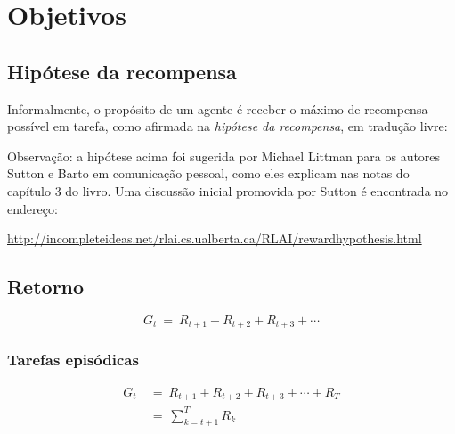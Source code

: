\documentclass{article}
\begin{document}
    \section{Objetivos}
    
        \subsection{Hipótese da recompensa}
    
            Informalmente, o propósito de um agente é receber o máximo de recompensa possível em tarefa, como afirmada na \emph{hipótese da recompensa}, em tradução livre:
            \begin{center}
            \noindent{}%
            \end{center}
            
            Observação: a hipótese acima foi sugerida por Michael Littman para os autores Sutton e Barto em comunicação pessoal, como eles explicam nas notas do capítulo 3 do livro. Uma discussão inicial promovida por Sutton é encontrada no endereço:
            
            \url{http://incompleteideas.net/rlai.cs.ualberta.ca/RLAI/rewardhypothesis.html}
        
        \subsection{Retorno}

            \begin{equation}
                G_t \ = \ R_{t+1} + R_{t+2} + R_{t+3} + \cdots
            \end{equation}

            \subsubsection{Tarefas episódicas}

                \begin{equation}
                \begin{split}
                    G_t & \ = \ R_{t+1} + R_{t+2} + R_{t+3} + \cdots + R_T \\
                    & \ = \ \sum_{k=t+1}^{T} R_k
                \end{split}
                \end{equation}
\end{document}
